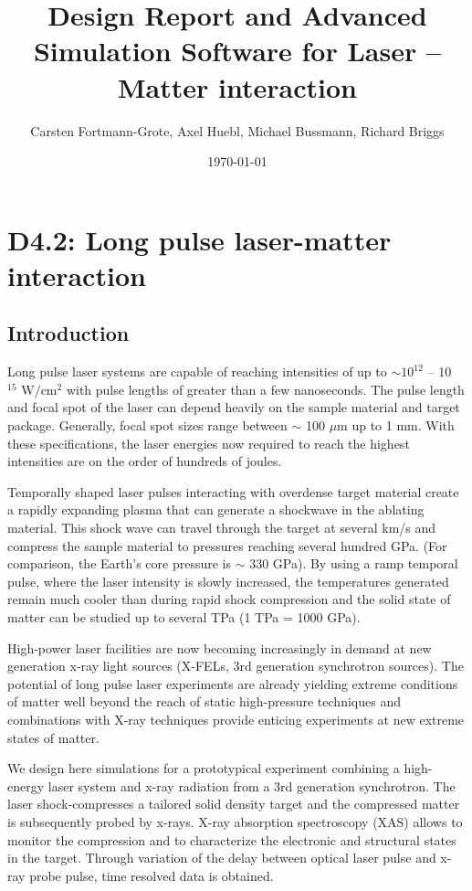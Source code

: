 \documentclass[a4paper]{article}
\title{Design Report and Advanced Simulation Software for Laser -- Matter interaction}
\author{Carsten Fortmann-Grote, Axel Huebl, Michael Bussmann, Richard
Briggs} %
\date{\today}
\begin{document}
\maketitle
\section{D4.2: Long pulse laser-matter interaction\label{sec:long_pulse}} %
\subsection{Introduction}
Long pulse laser systems are capable of reaching intensities of up to $\sim 10^{12}$ -- 10$^{15} \text{ W}/\text{cm}^2$ with pulse lengths of greater than a few nanoseconds. The pulse length and focal spot of the laser can depend heavily on the sample material and target package. Generally, focal spot sizes range between $\sim$ 100 $\mu$m up to 1 mm. With these specifications, the laser energies now required to reach the highest intensities are on the order of hundreds of joules.

Temporally shaped laser pulses interacting with overdense target material create a rapidly expanding plasma that
can generate a shockwave in the ablating material. This shock wave can travel through the target at several km/s
and compress the sample material to pressures reaching several hundred GPa. (For comparison, the Earth's core
pressure is $\sim$ 330 GPa). By using a ramp temporal pulse, where the laser intensity is slowly increased, the temperatures generated remain much cooler than during rapid shock compression and the solid state of matter can be studied up to several TPa (1 TPa = 1000 GPa).

High-power  laser facilities are now becoming increasingly in demand at new
generation x-ray light sources (X-FELs, 3rd generation synchrotron sources). The potential of long pulse laser experiments are already yielding extreme conditions of matter well beyond the reach of static high-pressure techniques and combinations with X-ray techniques provide enticing experiments at new extreme states of matter.

We design here simulations for a prototypical experiment combining a high-energy laser system and x-ray radiation
from a 3rd generation synchrotron. The laser shock-compresses a tailored solid density target and the compressed
matter is subsequently probed by x-rays. X-ray absorption spectroscopy (XAS) allows to monitor the compression and
to characterize the electronic and structural states in the target. Through variation of the delay between optical
laser pulse and x-ray probe pulse, time resolved data is obtained.
\end{document}
